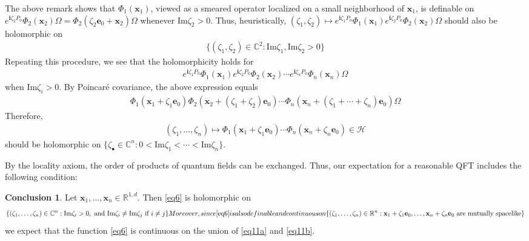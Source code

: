 \documentclass[12pt,b5paper,notitlepage]{article}
\theoremstyle{definition}
\newtheorem{concl}[df]{Conclusion}
\theoremstyle{plain}
\newcommand{\mc}{\mathcal}
\newcommand{\im}{\mathbf{i}}
\newcommand{\blt}{\bullet}
\newcommand{\Cbb}{\mathbb C}
\newcommand{\Rbb}{\mathbb R}
\newcommand{\Imag}{\mathrm{Im}}
\newcommand{\xbf}{\mathbf x}
\newcommand{\ebf}{\mathbf e}
\numberwithin{equation}{section}
\begin{document}
The above remark shows that $\Phi_1(\xbf_1)$, viewed as a smeared operator localized on a small neighborhood of $\xbf_1$, is definable on $e^{\im\zeta_2P_0}\Phi_2(\xbf_2)\Omega=\Phi_2(\zeta_2\ebf_0+\xbf_2)\Omega$ whenever $\Imag\zeta_2>0$. Thus, heuristically, $(\zeta_1,\zeta_2)\mapsto e^{\im\zeta_1P_0}\Phi_1(\xbf_1)e^{\im\zeta_2P_0}\Phi_2(\xbf_2)\Omega$ should also be holomorphic on
\begin{align*}
\{(\zeta_1,\zeta_2)\in\Cbb^2:\Imag\zeta_1,\Imag\zeta_2>0\}
\end{align*}
Repeating this procedure, we see that the holomorphicity holds for
\begin{align*}
e^{\im\zeta_1 P_0}\Phi_1(\xbf_1)e^{\im\zeta_2P_0}\Phi_2(\xbf_2)\cdots e^{\im\zeta_nP_0}\Phi_n(\xbf_n)\Omega
\end{align*}
when $\Imag\zeta_i>0$. By Poincar\'e covariance, the above expression equals
\begin{align*}
\Phi_1(\xbf_1+\zeta_1\ebf_0)\Phi_2(\xbf_2+(\zeta_1+\zeta_2)\ebf_0)\cdots\Phi_n(\xbf_n+(\zeta_1+\cdots+\zeta_n)\ebf_0)\Omega
\end{align*}
Therefore,
\begin{align}\label{eq6}
(\zeta_1,\dots,\zeta_n)\mapsto \Phi_1(\xbf_1+\zeta_1\ebf_0)\cdots\Phi_n(\xbf_n+\zeta_n\ebf_0)\in\mc H
\end{align}
should be holomorphic on $\{\zeta_\blt\in\Cbb^n:0<\Imag\zeta_1<\cdots<\Imag\zeta_n\}$.

By the locality axiom, the order of products of quantum fields can be exchanged. Thus, our expectation for a reasonable QFT includes the following condition:
\begin{concl}
Let $\xbf_1,\dots,\xbf_n\in\Rbb^{1,d}$. Then \eqref{eq6} is holomorphic on
\begin{subequations}\label{eq11}
\begin{align}\label{eq11a}
\{(\zeta_1,\dots,\zeta_n)\in\Cbb^n:\Imag\zeta_i>0,\text{ and }\Imag\zeta_i\neq\Imag\zeta_j\text{ if }i\neq j\}
\end{align}
Moreover, since \eqref{eq6} is also definable and continuous on
\begin{align}\label{eq11b}
\{(\zeta_1,\dots,\zeta_n)\in\Rbb^n:\text{$\xbf_1+\zeta_1\ebf_0,\dots,\xbf_n+\zeta_n\ebf_0$ are mutually spacelike}\}
\end{align}
\end{subequations}
we expect that the function \eqref{eq6} is continuous on the union of \eqref{eq11a} and \eqref{eq11b}.
\end{concl}
\end{document}
